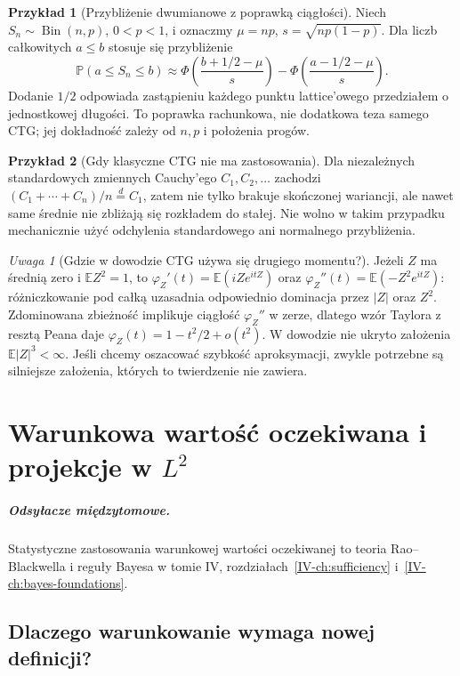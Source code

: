 \documentclass[11pt,a4paper,oneside]{report}
\numberwithin{equation}{chapter}
\theoremstyle{plain}
\theoremstyle{definition}
\newtheorem{przyklad}{Przykład}[chapter]
\theoremstyle{remark}
\newtheorem{uwaga}{Uwaga}[chapter]
\newcommand{\Prob}{\mathbb{P}}
\newcommand{\E}{\mathbb{E}}
\newcommand{\Bin}{\operatorname{Bin}}
\begin{document}
\begin{przyklad}[Przybliżenie dwumianowe z poprawką ciągłości]
Niech $S_n\sim\Bin(n,p)$, $0<p<1$, i oznaczmy
$\mu=np$, $s=\sqrt{np(1-p)}$.
Dla liczb całkowitych $a\leq b$ stosuje się przybliżenie
\[
\Prob(a\leq S_n\leq b)\approx
\Phi\!\left(\frac{b+1/2-\mu}{s}\right)-
\Phi\!\left(\frac{a-1/2-\mu}{s}\right).
\]
Dodanie $1/2$ odpowiada zastąpieniu każdego punktu
lattice'owego przedziałem o jednostkowej długości.
To poprawka rachunkowa, nie dodatkowa teza samego CTG;
jej dokładność zależy od $n,p$ i położenia progów.
\end{przyklad}

\begin{przyklad}[Gdy klasyczne CTG nie ma zastosowania]
Dla niezależnych standardowych zmiennych Cauchy'ego
$C_1,C_2,\ldots$ zachodzi
$(C_1+\cdots+C_n)/n\stackrel d=C_1$, zatem nie tylko
brakuje skończonej wariancji, ale nawet same średnie
nie zbliżają się rozkładem do stałej.
Nie wolno w takim przypadku mechanicznie użyć
odchylenia standardowego ani normalnego przybliżenia.
\end{przyklad}

\begin{uwaga}[Gdzie w dowodzie CTG używa się drugiego momentu?]
Jeżeli $Z$ ma średnią zero i $\E Z^2=1$, to
$\varphi_Z'(t)=\E(iZe^{itZ})$
oraz $\varphi_Z''(t)=\E(-Z^2e^{itZ})$:
różniczkowanie pod całką uzasadnia odpowiednio
dominacja przez $|Z|$ oraz $Z^2$.
Zdominowana zbieżność implikuje ciągłość
$\varphi_Z''$ w zerze, dlatego wzór Taylora
z resztą Peana daje $\varphi_Z(t)=1-t^2/2+o(t^2)$.
W dowodzie nie ukryto założenia $\E|Z|^3<\infty$.
Jeśli chcemy oszacować szybkość aproksymacji,
zwykle potrzebne są silniejsze założenia, których
to twierdzenie nie zawiera.
\end{uwaga}

\chapter{Warunkowa wartość oczekiwana i projekcje w \texorpdfstring{$L^2$}{L2}}
\label{ch:condexp}
\paragraph{Odsyłacze międzytomowe.} Statystyczne zastosowania warunkowej wartości oczekiwanej to teoria Rao--Blackwella i reguły Bayesa w tomie IV, rozdziałach~\ref{IV-ch:sufficiency} i~\ref{IV-ch:bayes-foundations}.

\section{Dlaczego warunkowanie wymaga nowej definicji?}
\end{document}
